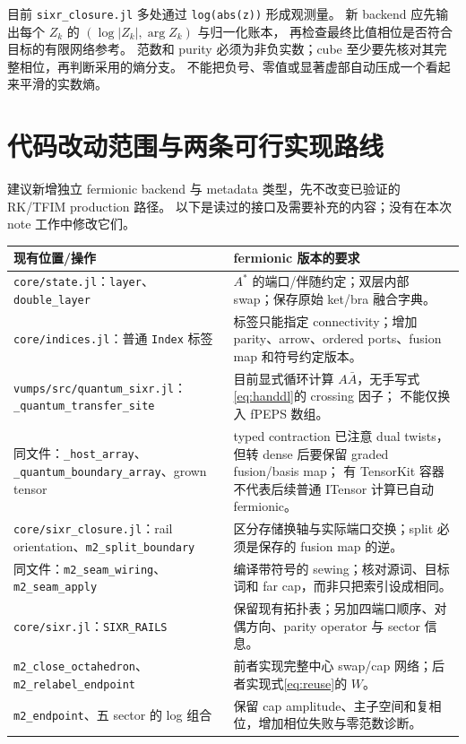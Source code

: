 \documentclass[11pt]{article}
\newcommand{\code}[1]{\texttt{\small #1}}
\begin{document}
目前 \code{sixr\_closure.jl} 多处通过 \code{log(abs(z))} 形成观测量。
新 backend 应先输出每个 $Z_k$ 的 $(\log|Z_k|,\arg Z_k)$ 与归一化账本，
再检查最终比值相位是否符合目标的有限网络参考。
范数和 purity 必须为非负实数；cube 至少要先核对其完整相位，再判断采用的熵分支。
不能把负号、零值或显著虚部自动压成一个看起来平滑的实数熵。

\section{代码改动范围与两条可行实现路线}

建议新增独立 fermionic backend 与 metadata 类型，先不改变已验证的 RK/TFIM production 路径。
以下是读过的接口及需要补充的内容；没有在本次 note 工作中修改它们。
\begin{longtable}{p{}p{}}
\toprule
现有位置/操作 & fermionic 版本的要求\\\midrule\endhead
\code{core/state.jl}：\code{layer}、\code{double\_layer}
& $A^*$ 的端口/伴随约定；双层内部 swap；保存原始 ket/bra 融合字典。\\
\code{core/indices.jl}：普通 \code{Index} 标签
& 标签只能指定 connectivity；增加 parity、arrow、ordered ports、fusion map 和符号约定版本。\\
\code{vumps/src/quantum\_sixr.jl}：
\code{\_quantum\_transfer\_site}
& 目前显式循环计算 $A\bar A$，无手写式\eqref{eq:handdl}的 crossing 因子；
不能仅换入 fPEPS 数组。\\
同文件：\code{\_host\_array}、\code{\_quantum\_boundary\_array}、grown tensor
& typed contraction 已注意 dual twists，但转 dense 后要保留 graded fusion/basis map；
有 TensorKit 容器不代表后续普通 ITensor 计算已自动 fermionic。\\
\code{core/sixr\_closure.jl}：rail orientation、\code{m2\_split\_boundary}
& 区分存储换轴与实际端口交换；split 必须是保存的 fusion map 的逆。\\
同文件：\code{m2\_seam\_wiring}、\code{m2\_seam\_apply}
& 编译带符号的 sewing；核对源词、目标词和 far cap，而非只把索引设成相同。\\
\code{core/sixr.jl}：\code{SIXR\_RAILS}
& 保留现有拓扑表；另加四端口顺序、对偶方向、parity operator 与 sector 信息。\\
\code{m2\_close\_octahedron}、\code{m2\_relabel\_endpoint}
& 前者实现完整中心 swap/cap 网络；后者实现式\eqref{eq:reuse}的 $W$。\\
\code{m2\_endpoint}、五 sector 的 log 组合
& 保留 cap amplitude、主子空间和复相位，增加相位失败与零范数诊断。\\\bottomrule
\end{longtable}
\end{document}

